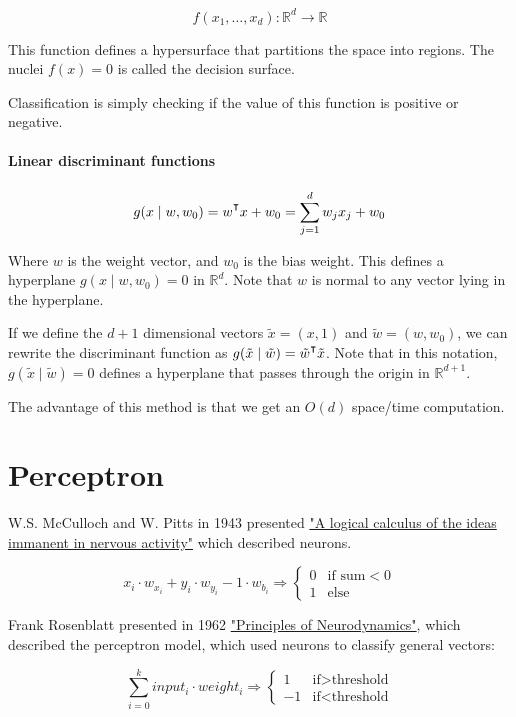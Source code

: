\documentclass{idc_msc}
\renewcommand{\T}{{\mathpalette\raiseT\intercal}} %
\begin{document}
\[f(x_1,\ldots,x_d) : \mathbb{R}^d \to \mathbb{R}\]

This function defines a hypersurface that partitions the space into regions.
The nuclei \(f(x) = 0\) is called the decision surface.

Classification is simply checking if the value of this function is positive or negative.

\paragraph{Linear discriminant functions}

\[g(x\mid w, w_0) = w^\T x + w_0 = \sum_{j=1}^d w_jx_j+w_0\]

Where \(w\) is the weight vector, and \(w_0\) is the bias weight.
This defines a hyperplane \(g(x\mid w, w_0) = 0\) in \(\mathbb{R}^d\).
Note that \(w\) is normal to any vector lying in the hyperplane.

If we define the \(d+1\) dimensional vectors \(\tilde{x}=(x,1)\) and \(\tilde{w}=(w,w_0)\), we can rewrite the discriminant function as \(g(\tilde{x}\mid \tilde{w}) = \tilde{w}^\T\tilde{x}\).
Note that in this notation, \(g(\tilde{x} \mid \tilde{w}) = 0\) defines a hyperplane that passes through the origin in \(\mathbb{R}^{d+1}\).

The advantage of this method is that we get an \(O(d)\) space/time computation.


\clearpage
\section{Perceptron}

W.S. McCulloch and W. Pitts in 1943 presented \href{http://vordenker.de/ggphilosophy/mcculloch_a-logical-calculus.pdf}{"A logical calculus of the ideas immanent in nervous activity"} which described neurons.

\[
  x_i \cdot w_{x_i} + y_i \cdot w_{y_i} - 1 \cdot w_{b_i} \Rightarrow
  \begin{cases}
    0 & \text{if sum} < 0 \\
    1 & \text{else}
  \end{cases}
\]

Frank Rosenblatt presented in 1962 \href{http://www.dtic.mil/get-tr-doc/pdf?AD=AD0256582}{"Principles of Neurodynamics"}, which described the perceptron model, which used neurons to classify general vectors:

\[
\sum_{i=0}^k input_i \cdot weight_i \Rightarrow
  \begin{cases}
1 & \text{if} > \text{threshold} \\
-1 & \text{if} < \text{threshold}
  \end{cases}
\]
\end{document}

